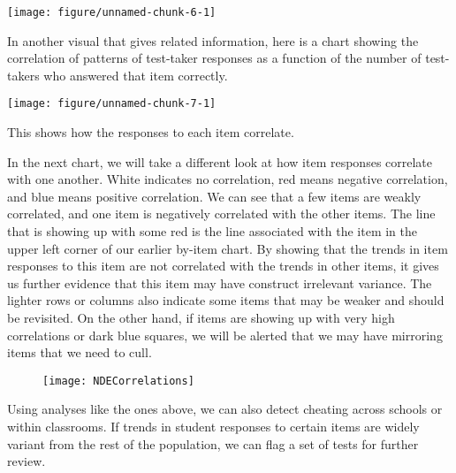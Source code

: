 \documentclass{article}\usepackage[]{graphicx}\usepackage[]{color}
\newenvironment{knitrout}{}{} %
\begin{document}
\begin{enumerate}
\centering
\begin{knitrout}
\color{fgcolor}

{\centering \texttt{[image: figure/unnamed-chunk-6-1]} 

}



\end{knitrout}
\raggedright
In another visual that gives related information, here is a chart showing the correlation of patterns of test-taker responses as a function of the number of test-takers who answered that item correctly.

\centering
\begin{knitrout}
\color{fgcolor}

{\centering \texttt{[image: figure/unnamed-chunk-7-1]} 

}



\end{knitrout}
\raggedright
This shows how the responses to each item correlate. 

In the next chart, we will take a different look at how item responses correlate with one another. White indicates no correlation, red means negative correlation, and blue means positive correlation. We can see that a few items are weakly correlated, and one item is negatively correlated with the other items. The line that is showing up with some red is the line associated with the item in the upper left corner of our earlier by-item chart. By showing that the trends in item responses to this item are not correlated with the trends in other items, it gives us further evidence that this item may have construct irrelevant variance. The lighter rows or columns also indicate some items that may be weaker and should be revisited. On the other hand, if items are showing up with very high correlations or dark blue squares, we will be alerted that we may have mirroring items that we need to cull.

\centering
\begin{figure}

\texttt{[image: NDECorrelations]}
\end{figure}
\raggedright
Using analyses like the ones above, we can also detect cheating across schools or within classrooms. If trends in student responses to certain items are widely variant from the rest of the population, we can flag a set of tests for further review.
\raggedright


\end{enumerate}
\end{document}
